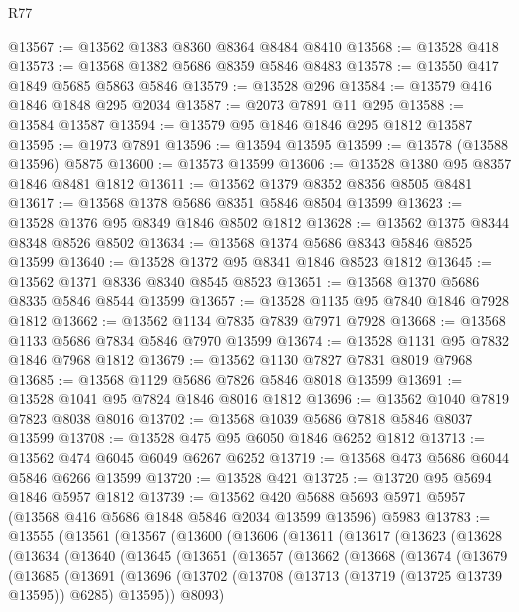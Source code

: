\begin{lexlean}{R77}
\begin{coremodule}
@13567 := @13562 @1383 @8360 @8364 @8484 @8410
@13568 := @13528 @418
@13573 := @13568 @1382 @5686 @8359 @5846 @8483
@13578 := @13550 @417 @1849 @5685 @5863 @5846
@13579 := @13528 @296
@13584 := @13579 @416 @1846 @1848 @295 @2034
@13587 := @2073 @7891 @11 @295
@13588 := @13584 @13587
@13594 := @13579 @95 @1846 @1846 @295 @1812 @13587
@13595 := @1973 @7891
@13596 := @13594 @13595
@13599 := @13578 (@13588 @13596) @5875
@13600 := @13573 @13599
@13606 := @13528 @1380 @95 @8357 @1846 @8481 @1812
@13611 := @13562 @1379 @8352 @8356 @8505 @8481
@13617 := @13568 @1378 @5686 @8351 @5846 @8504 @13599
@13623 := @13528 @1376 @95 @8349 @1846 @8502 @1812
@13628 := @13562 @1375 @8344 @8348 @8526 @8502
@13634 := @13568 @1374 @5686 @8343 @5846 @8525 @13599
@13640 := @13528 @1372 @95 @8341 @1846 @8523 @1812
@13645 := @13562 @1371 @8336 @8340 @8545 @8523
@13651 := @13568 @1370 @5686 @8335 @5846 @8544 @13599
@13657 := @13528 @1135 @95 @7840 @1846 @7928 @1812
@13662 := @13562 @1134 @7835 @7839 @7971 @7928
@13668 := @13568 @1133 @5686 @7834 @5846 @7970 @13599
@13674 := @13528 @1131 @95 @7832 @1846 @7968 @1812
@13679 := @13562 @1130 @7827 @7831 @8019 @7968
@13685 := @13568 @1129 @5686 @7826 @5846 @8018 @13599
@13691 := @13528 @1041 @95 @7824 @1846 @8016 @1812
@13696 := @13562 @1040 @7819 @7823 @8038 @8016
@13702 := @13568 @1039 @5686 @7818 @5846 @8037 @13599
@13708 := @13528 @475 @95 @6050 @1846 @6252 @1812
@13713 := @13562 @474 @6045 @6049 @6267 @6252
@13719 := @13568 @473 @5686 @6044 @5846 @6266 @13599
@13720 := @13528 @421
@13725 := @13720 @95 @5694 @1846 @5957 @1812
@13739 := @13562
    @420
    @5688
    @5693
    @5971
    @5957
    (@13568 @416 @5686 @1848 @5846 @2034 @13599 @13596)
    @5983
@13783 := @13555
    (@13561
      (@13567
        (@13600
          (@13606
            (@13611
              (@13617
                (@13623
                  (@13628
                    (@13634
                      (@13640
                        (@13645
                          (@13651
                            (@13657
                              (@13662
                                (@13668
                                  (@13674
                                    (@13679
                                      (@13685
                                        (@13691
                                          (@13696
                                            (@13702
                                              (@13708
                                                (@13713 (@13719 (@13725 @13739 @13595)) @6285)
                                                @13595))
                                            @8093)

\end{coremodule}
\end{lexlean}
